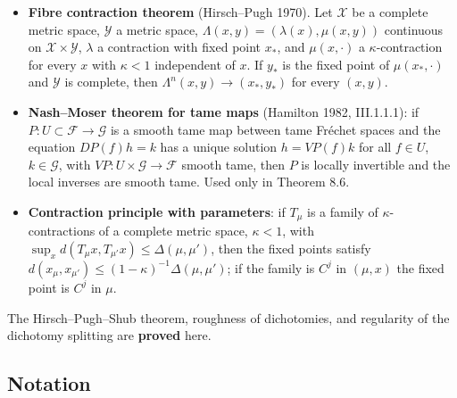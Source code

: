 \documentclass[11pt,a4paper]{article}
\theoremstyle{plain}
\theoremstyle{definition}
\theoremstyle{remark}
\numberwithin{equation}{section}
\numberwithin{figure}{section}
\begin{document}
\begin{itemize}
\item [(FCT)] \textbf{Fibre contraction theorem} (Hirsch–Pugh 1970). Let $\mathcal X$ be a complete metric space, $\mathcal Y$ a metric space, $\Lambda(x,y)=(\lambda(x),\mu(x,y))$ continuous on $\mathcal X\times\mathcal Y$, $\lambda$ a contraction with fixed point $x_*$, and $\mu(x,\cdot)$ a $\kappa$-contraction for every $x$ with $\kappa<1$ independent of $x$. If $y_*$ is the fixed point of $\mu(x_*,\cdot)$ and $\mathcal Y$ is complete, then $\Lambda^n(x,y)\to(x_*,y_*)$ for every $(x,y)$.

\item [(NM)] \textbf{Nash–Moser theorem for tame maps} (Hamilton 1982, III.1.1.1): if $P:U\subset\mathcal F\to\mathcal G$ is a smooth tame map between tame Fréchet spaces and the equation $DP(f)h=k$ has a unique solution $h=VP(f)k$ for all $f\in U$, $k\in\mathcal G$, with $VP:U\times\mathcal G\to\mathcal F$ smooth tame, then $P$ is locally invertible and the local inverses are smooth tame. Used only in Theorem 8.6.

\item [(CT)] \textbf{Contraction principle with parameters}: if $T_\mu$ is a family of $\kappa$-contractions of a complete metric space, $\kappa<1$, with $\sup_x d(T_\mu x,T_{\mu'}x)\le\Delta(\mu,\mu')$, then the fixed points satisfy $d(x_\mu,x_{\mu'})\le(1-\kappa)^{-1}\Delta(\mu,\mu')$; if the family is $C^j$ in $(\mu,x)$ the fixed point is $C^j$ in $\mu$.
\end{itemize}

The Hirsch–Pugh–Shub theorem, roughness of dichotomies, and regularity of the dichotomy splitting are \textbf{proved} here.

\subsection{Notation}
\end{document}
